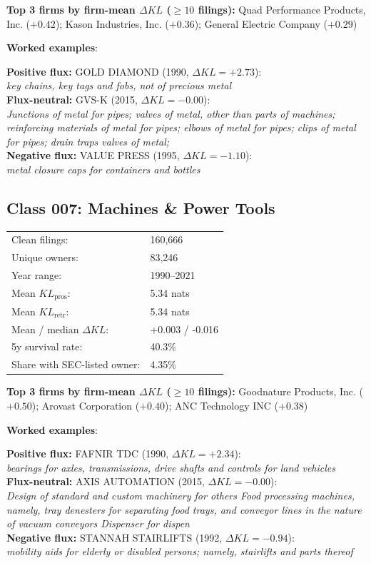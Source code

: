 \textbf{Top 3 firms by firm-mean $\Delta KL$ ($\geq 10$ filings):} Quad Performance Products, Inc. ($+0.42$); Kason Industries, Inc. ($+0.36$); General Electric Company ($+0.29$)

\textbf{Worked examples}:

  \textbf{Positive flux:} \textsc{GOLD DIAMOND} (1990, $\Delta KL=+2.73$):\\
  \textit{key chains, key tags and fobs, not of precious metal}\\
  \textbf{Flux-neutral:} \textsc{GVS-K} (2015, $\Delta KL=-0.00$):\\
  \textit{Junctions of metal for pipes; valves of metal, other than parts of machines; reinforcing materials of metal for pipes; elbows of metal for pipes; clips of metal for pipes; drain traps valves of metal;}\\
  \textbf{Negative flux:} \textsc{VALUE PRESS} (1995, $\Delta KL=-1.10$):\\
  \textit{metal closure caps for containers and bottles}\\

\subsection*{Class 007: Machines \& Power Tools}
\label{app:industry-007}

\begin{tabular}{ll}
Clean filings: & 160,666 \\
Unique owners: & 83,246 \\
Year range: & 1990--2021 \\
Mean $KL_\text{pros}$: & 5.34 nats \\
Mean $KL_\text{retr}$: & 5.34 nats \\
Mean / median $\Delta KL$: & +0.003 / -0.016 \\
5y survival rate: & 40.3\% \\
Share with SEC-listed owner: & 4.35\% \\
\end{tabular}

\textbf{Top 3 firms by firm-mean $\Delta KL$ ($\geq 10$ filings):} Goodnature Products, Inc. ($+0.50$); Arovast Corporation ($+0.40$); ANC Technology INC ($+0.38$)

\textbf{Worked examples}:

  \textbf{Positive flux:} \textsc{FAFNIR TDC} (1990, $\Delta KL=+2.34$):\\
  \textit{bearings for axles, transmissions, drive shafts and controls for land vehicles}\\
  \textbf{Flux-neutral:} \textsc{AXIS AUTOMATION} (2015, $\Delta KL=-0.00$):\\
  \textit{Design of standard and custom machinery for others Food processing machines, namely, tray denesters for separating food trays, and conveyor lines in the nature of vacuum conveyors Dispenser for dispen}\\
  \textbf{Negative flux:} \textsc{STANNAH STAIRLIFTS} (1992, $\Delta KL=-0.94$):\\
  \textit{mobility aids for elderly or disabled persons; namely, stairlifts and parts thereof}\\

